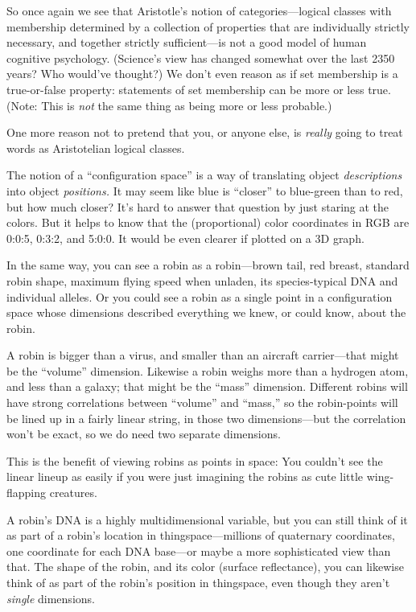 { So once again we see that Aristotle's notion of
categories---logical classes with membership determined by a collection
of properties that are individually strictly necessary, and together
strictly sufficient---is not a good model of human cognitive
psychology. (Science's view has changed somewhat over
the last 2350 years? Who would've thought?) We
don't even reason as if set membership is a
true-or-false property: statements of set membership can be more or
less true. (Note: This is \textit{not} the same thing as being more or
less probable.)


 One more reason not to pretend that you, or anyone else, is
\textit{really} going to treat words as Aristotelian logical classes.

\myendsectiontext


\bigskip



 The notion of a ``configuration
space'' is a way of translating object
\textit{descriptions} into object \textit{positions.} It may seem like
blue is ``closer'' to blue-green
than to red, but how much closer? It's hard to answer
that question by just staring at the colors. But it helps to know that
the (proportional) color coordinates in RGB are 0:0:5, 0:3:2, and
5:0:0. It would be even clearer if plotted on a 3D graph.


 In the same way, you can see a robin as a robin---brown tail, red
breast, standard robin shape, maximum flying speed when unladen, its
species-typical DNA and individual alleles. Or you could see a robin as
a single point in a configuration space whose dimensions described
everything we knew, or could know, about the robin.


 A robin is bigger than a virus, and smaller than an aircraft
carrier---that might be the
``volume'' dimension. Likewise a
robin weighs more than a hydrogen atom, and less than a galaxy; that
might be the ``mass'' dimension.
Different robins will have strong correlations between
``volume'' and
``mass,'' so the robin-points will
be lined up in a fairly linear string, in those two dimensions---but
the correlation won't be exact, so we do need two
separate dimensions.


 This is the benefit of viewing robins as points in space: You
couldn't see the linear lineup as easily if you were
just imagining the robins as cute little wing-flapping creatures.


 A robin's DNA is a highly multidimensional
variable, but you can still think of it as part of a
robin's location in thingspace---millions of quaternary
coordinates, one coordinate for each DNA base---or maybe a more
sophisticated view than that. The shape of the robin, and its color
(surface reflectance), you can likewise think of as part of the
robin's position in thingspace, even though they
aren't \textit{single} dimensions.


}

